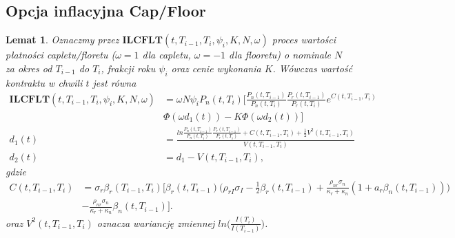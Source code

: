 \documentclass{mini}
\theoremstyle{mythstyle}
\newtheorem{Lemat}{Lemat}[chapter]
\begin{document}
	\subsection{Opcja inflacyjna Cap/Floor}
	\begin{Lemat}
		Oznaczmy przez $\mathbf{ILCFLT}(t,T_{i-1},T_i,\psi_i,K,N,\omega)$ proces wartości płatności capletu/floretu ($\omega =1$ dla capletu, $\omega = -1$ dla flooretu) o nominale $N$ za okres od $T_{i-1}$ do $T_i$, frakcji roku $\psi_i$ oraz cenie wykonania $K$. Wówczas wartość kontraktu w chwili $t$ jest równa
		\begin{align*}
		\mathbf{ILCFLT}(t,T_{i-1},T_i,\psi_i,K,N,\omega) &= \omega N\psi_iP_n(t,T_i)\bigg[ \frac{P_n(t,T_{i-1})}{P_n(t,T_i)} \frac{P_r(t,T_{i-1})}{P_r(t,T_i)} e^{C(t,T_{i-1},T_i)} \\ &\Phi(\omega d_1(t)) - K\Phi(\omega d_2(t))\bigg] \\
		d_1(t) &= \frac{ln \frac{P_n(t,T_{i-1})}{P_n(t,T_i)} \frac{P_r(t,T_{i-1})}{P_r(t,T_i)} + C(t,T_{i-1},T_i) + \frac{1}{2} V^2(t,T_{i-1},T_i)}{V(t,T_{i-1},T_i)}\\
		d_2(t)&= d_1 - V(t,T_{i-1},T_i),
		\end{align*}
		gdzie 
		\begin{align*}
		C(t,T_{i-1},T_i) &= \sigma_r\beta_r(T_{i-1},T_i) \bigg[ \beta_r(t,T_{i-1}) \bigg( \rho_{rI}\sigma_I - \frac{1}{2} \beta_r (t,T_{i-1}) 
		+ \frac{\rho_{nr}\sigma_n}{\kappa_r + \kappa_n} (1+a_r\beta_n(t,T_{i-1})) \bigg)\\&-  \frac{\rho_{nr}\sigma_n}{\kappa_r + \kappa_n} \beta_n(t,T_{i-1}) \bigg].
		\end{align*}
		oraz $V^2(t,T_{i-1},T_i)$ oznacza wariancję zmiennej $ln\bigg(\frac{I(T_i)}{I(T_{i-1})}\bigg)$.
	\end{Lemat}
\end{document}
